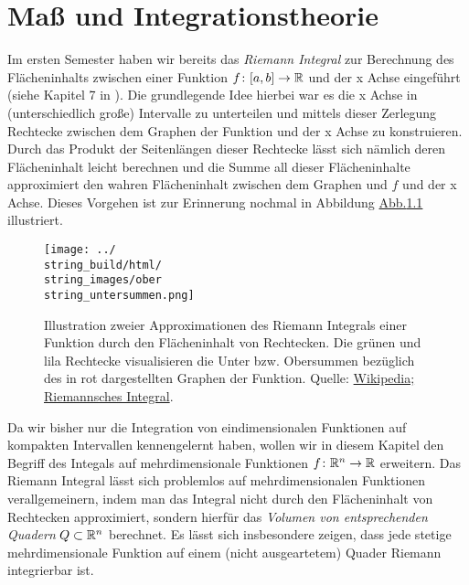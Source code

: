 \chapter{Maß  und Integrationstheorie}
\label{\detokenize{masstheorie/intro_masstheorie:masz-und-integrationstheorie}}\label{\detokenize{masstheorie/intro_masstheorie::doc}}
\par
Im ersten Semester haben wir bereits das \emph{Riemann Integral} zur Berechnung des Flächeninhalts zwischen einer Funktion \(f \colon [a,b] \rightarrow \mathbb{R}\) und der x Achse eingeführt (siehe Kapitel 7 in \cite{Bur20}).
Die grundlegende Idee hierbei war es die x Achse in (unterschiedlich große) Intervalle zu unterteilen und mittels dieser Zerlegung Rechtecke zwischen dem Graphen der Funktion und der x Achse zu konstruieren.
Durch das Produkt der Seitenlängen dieser Rechtecke lässt sich nämlich deren Flächeninhalt leicht berechnen und die Summe all dieser Flächeninhalte approximiert den wahren Flächeninhalt zwischen dem Graphen und \(f\) und der x Achse.
Dieses Vorgehen ist zur Erinnerung nochmal in Abbildung \hyperref[\detokenize{masstheorie/intro_masstheorie:fig-riemann-integral}]{Abb.\@ \ref{\detokenize{masstheorie/intro_masstheorie:fig-riemann-integral}}} illustriert.

\begin{figure}[htbp]
\centering


\noindent\texttt{[image: ../\\string\_build/html/\\string\_images/ober\\string\_untersummen.png]}
\caption{Illustration zweier Approximationen des Riemann Integrals einer Funktion durch den Flächeninhalt von Rechtecken. Die grünen und lila Rechtecke visualisieren die Unter  bzw. Obersummen bezüglich des in rot dargestellten Graphen der Funktion. Quelle: \href{https://de.wikipedia.org/wiki/Riemannsches\_Integral}{Wikipedia; Riemannsches Integral}.}\label{\detokenize{masstheorie/intro_masstheorie:fig-riemann-integral}}\end{figure}

\par
Da wir bisher nur die Integration von eindimensionalen Funktionen auf kompakten Intervallen kennengelernt haben, wollen wir in diesem Kapitel den Begriff des Integals auf mehrdimensionale Funktionen \(f \colon \mathbb{R}^n \rightarrow \mathbb{R}\) erweitern.
Das Riemann Integral lässt sich problemlos auf mehrdimensionalen Funktionen verallgemeinern, indem man das Integral nicht durch den Flächeninhalt von Rechtecken approximiert, sondern hierfür das \emph{Volumen von entsprechenden Quadern} \(Q \subset \mathbb{R}^n\) berechnet.
Es lässt sich insbesondere zeigen, dass jede stetige mehrdimensionale Funktion auf einem (nicht ausgeartetem) Quader Riemann integrierbar ist.

